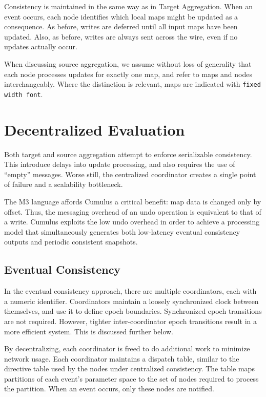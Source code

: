 \documentclass{vldb}
\begin{document}
Consistency is maintained in the same way as in Target Aggregation.  When an event occurs, each node identifies which local maps might be updated as a consequence.  As before, writes are deferred until all input maps have been updated.  Also, as before, writes are always sent across the wire, even if no updates actually occur.  

When discussing source aggregation, we assume without loss of generality that each node processes updates for exactly one map, and refer to maps and nodes interchangeably.  Where the distinction is relevant, maps are indicated with \texttt{fixed width font}.

\section{Decentralized Evaluation}
Both target and source aggregation attempt to enforce serializable consistency.  This introduce delays into update processing, and also requires the use of ``empty'' messages.  Worse still, the centralized coordinator creates a single point of failure and a scalability bottleneck.  

The M3 language affords Cumulus a critical benefit: map data is changed only by offset.  Thus, the messaging overhead of an undo operation is equivalent to that of a write.  Cumulus exploits the low undo overhead in order to achieve a processing model that simultaneously generates both low-latency eventual consistency outputs and periodic consistent snapshots.  

\subsection{Eventual Consistency}
\label{sec:eventualconsistency}
In the eventual consistency approach, there are multiple coordinators, each with a numeric identifier.  Coordinators maintain a loosely synchronized clock between themselves, and use it to define epoch boundaries.  Synchronized epoch transitions are not required.  However, tighter inter-coordinator epoch transitions result in a more efficient system.  This is discussed further below.

By decentralizing, each coordinator is freed to do additional work to minimize network usage.  Each coordinator maintains a dispatch table, similar to the directive table used by the nodes under centralized consistency.  The table maps  partitions of each event's parameter space to the set of nodes required to process the partition.  When an event occurs, only these nodes are notified.
\end{document}
